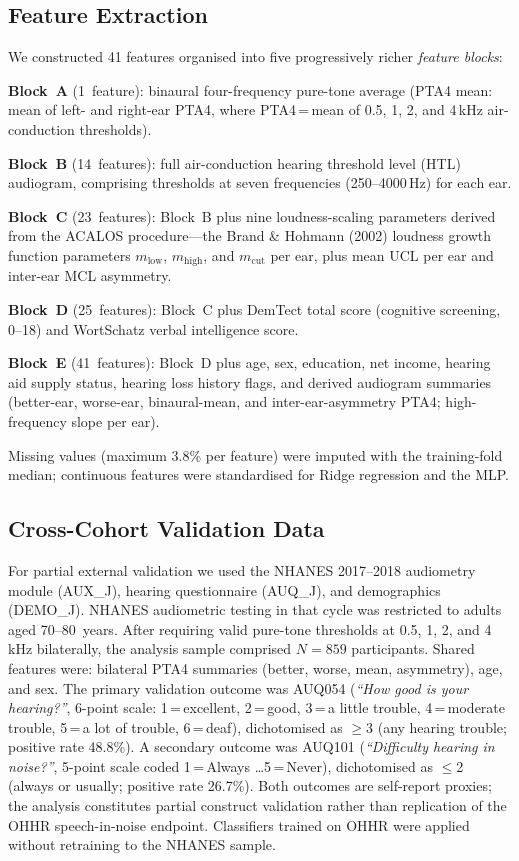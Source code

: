 \documentclass[12pt,a4paper]{article}
\begin{document}
\subsection{Feature Extraction}

We constructed 41 features organised into five progressively richer
\textit{feature blocks}:

\textbf{Block~A} (1~feature): binaural four-frequency pure-tone average
(PTA4 mean: mean of left- and right-ear PTA4, where PTA4\,=\,mean of 0.5,
1, 2, and 4\,kHz air-conduction thresholds).

\textbf{Block~B} (14~features): full air-conduction hearing threshold level
(HTL) audiogram, comprising thresholds at seven frequencies (250--4000\,Hz)
for each ear.

\textbf{Block~C} (23~features): Block~B plus nine loudness-scaling parameters
derived from the ACALOS procedure---the Brand \& Hohmann (2002)
loudness growth function parameters $m_\text{low}$, $m_\text{high}$, and
$m_\text{cut}$ per ear\cite{Brand2002}, plus mean UCL per ear and inter-ear
MCL asymmetry.

\textbf{Block~D} (25~features): Block~C plus DemTect total score (cognitive
screening, 0--18) and WortSchatz verbal intelligence score.

\textbf{Block~E} (41~features): Block~D plus age, sex, education, net income,
hearing aid supply status, hearing loss history flags, and derived audiogram
summaries (better-ear, worse-ear, binaural-mean, and inter-ear-asymmetry
PTA4; high-frequency slope per ear).

Missing values (maximum 3.8\% per feature) were imputed with the
training-fold median; continuous features were standardised for Ridge
regression and the MLP.

\subsection{Cross-Cohort Validation Data}
\label{sec:nhanes}

For partial external validation we used the NHANES 2017--2018 audiometry
module (AUX\_J), hearing questionnaire (AUQ\_J), and demographics
(DEMO\_J)\cite{NHANES2018}.  NHANES audiometric testing in that cycle was
restricted to adults aged 70--80~years.  After requiring valid pure-tone
thresholds at 0.5, 1, 2, and 4\,kHz bilaterally, the analysis sample
comprised $N=859$ participants.  Shared features were: bilateral PTA4
summaries (better, worse, mean, asymmetry), age, and sex.  The primary
validation outcome was AUQ054 (\textit{``How good is your hearing?''},
6-point scale: 1\,=\,excellent, 2\,=\,good, 3\,=\,a little trouble,
4\,=\,moderate trouble, 5\,=\,a lot of trouble, 6\,=\,deaf), dichotomised as
$\geq$3 (any hearing trouble; positive rate 48.8\%).  A secondary outcome was AUQ101
(\textit{``Difficulty hearing in noise?''}, 5-point scale coded
1\,=\,Always \ldots 5\,=\,Never), dichotomised as $\leq$2 (always or
usually; positive rate 26.7\%).  Both outcomes are self-report proxies; the
analysis constitutes partial construct validation rather than replication of
the OHHR speech-in-noise endpoint.  Classifiers trained on OHHR were applied
without retraining to the NHANES sample.
\end{document}
